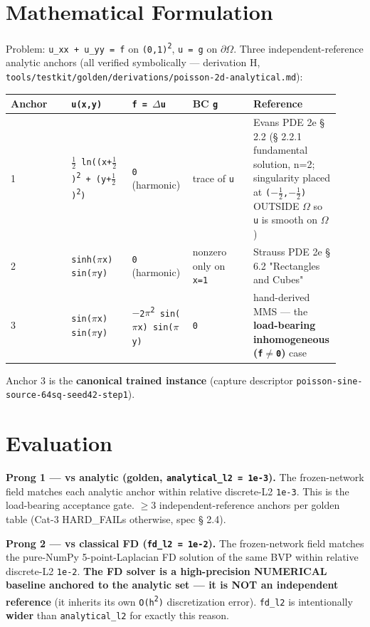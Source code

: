 \documentclass{bitphysics-preprint}
\begin{document}
\section{Mathematical Formulation}
Problem: \texttt{u\_xx + u\_yy = f} on \texttt{(0,1)\textsuperscript{2}}, \texttt{u = g} on \texttt{$\partial$$\Omega$}. Three independent-reference analytic anchors (all verified symbolically --- derivation H, \texttt{tools/testkit/golden/derivations/poisson-2d-analytical.md}):

\begin{center}
\begin{tabular}{|p{0.184\linewidth}|p{0.184\linewidth}|p{0.184\linewidth}|p{0.184\linewidth}|p{0.184\linewidth}|}
\hline
\textbf{Anchor} & \textbf{\texttt{u(x,y)}} & \textbf{\texttt{f = $\Delta$u}} & \textbf{BC \texttt{g}} & \textbf{Reference} \\ \hline
1 & \texttt{$\tfrac{1}{2}$ ln((x+$\tfrac{1}{2}$)\textsuperscript{2} + (y+$\tfrac{1}{2}$)\textsuperscript{2})} & \texttt{0} (harmonic) & trace of \texttt{u} & Evans PDE 2e \S{} 2.2 (\S{} 2.2.1 fundamental solution, n=2; singularity placed at \texttt{($-$$\tfrac{1}{2}$,$-$$\tfrac{1}{2}$)} OUTSIDE $\Omega$ so \texttt{u} is smooth on $\Omega$) \\ \hline
2 & \texttt{sinh($\pi$x) sin($\pi$y)} & \texttt{0} (harmonic) & nonzero only on \texttt{x=1} & Strauss PDE 2e \S{} 6.2 "Rectangles and Cubes" \\ \hline
3 & \texttt{sin($\pi$x) sin($\pi$y)} & \texttt{$-$2$\pi$\textsuperscript{2} sin($\pi$x) sin($\pi$y)} & \texttt{0} & hand-derived MMS --- the \textbf{load-bearing inhomogeneous (\texttt{f$\neq$0})} case \\ \hline
\end{tabular}
\end{center}

Anchor 3 is the \textbf{canonical trained instance} (capture descriptor \texttt{poisson-sine-source-64sq-seed42-step1}).

\section{Evaluation}
\textbf{Prong 1 --- vs analytic (golden, \texttt{analytical\_l2 = 1e-3}).} The frozen-network field matches each analytic anchor within relative discrete-L2 \texttt{1e-3}. This is the load-bearing acceptance gate. $\geq$3 independent-reference anchors per golden table (Cat-3 HARD\_FAILs otherwise, spec \S{} 2.4).

\textbf{Prong 2 --- vs classical FD (\texttt{fd\_l2 = 1e-2}).} The frozen-network field matches the pure-NumPy 5-point-Laplacian FD solution of the same BVP within relative discrete-L2 \texttt{1e-2}. \textbf{The FD solver is a high-precision NUMERICAL baseline anchored to the analytic set --- it is NOT an independent reference} (it inherits its own \texttt{O(h\textsuperscript{2})} discretization error). \texttt{fd\_l2} is intentionally \textbf{wider} than \texttt{analytical\_l2} for exactly this reason.
\end{document}
